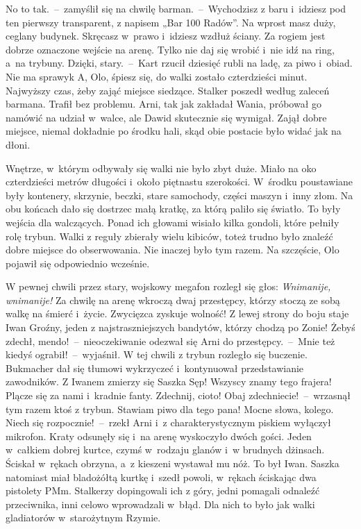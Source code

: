 \documentclass[../MAIN.tex]{subfiles}
\begin{document}
\xx No to tak.~--~zamyślił się na chwilę barman.~--~Wychodzisz z baru i~idziesz pod ten pierwszy transparent, z napisem „Bar 100 Radów”. Na wprost masz duży, ceglany budynek. Skręcasz w~prawo i~idziesz wzdłuż ściany. Za rogiem jest dobrze oznaczone wejście na arenę. Tylko nie daj się wrobić i~nie idź na ring, a~na trybuny.
\xx Dzięki, stary.~--~Kart rzucił dziesięć rubli na ladę, za piwo i~obiad.
\xx Nie ma sprawy\3k A, Olo, śpiesz się, do walki zostało czterdzieści minut. Najwyższy czas, żeby zająć miejsce siedzące.
\qd
Stalker poszedł według zaleceń barmana. Trafił bez problemu. Arni, tak jak zakładał Wania, próbował go namówić na udział w~walce, ale Dawid skutecznie się wymigał. Zajął dobre miejsce, niemal dokładnie po środku hali, skąd obie postacie było widać jak na dłoni.

Wnętrze, w~którym odbywały się walki nie było zbyt duże. Miało na oko czterdzieści metrów długości i~około piętnastu szerokości. W~środku poustawiane były kontenery, skrzynie, beczki, stare samochody, części maszyn i~inny złom. Na obu końcach dało się dostrzec małą kratkę, za którą paliło się światło. To były wejścia dla walczących. Ponad ich głowami wisiało kilka gondoli, które pełniły rolę trybun. Walki z reguły zbierały wielu kibiców, toteż trudno było znaleźć dobre miejsce do obserwowania. Nie inaczej było tym razem. Na szczęście, Olo pojawił się odpowiednio wcześnie.

W pewnej chwili przez stary, wojskowy megafon rozległ się głos:
\sx \textit{Wnimanije, wnimanije!} Za chwilę na arenę wkroczą dwaj przestępcy, którzy stoczą ze sobą walkę na śmierć i~życie. Zwycięzca zyskuje wolność! Z lewej strony do boju staje Iwan Groźny, jeden z najstraszniejszych bandytów, którzy chodzą po Zonie! Żebyś zdechł, mendo!~--~nieoczekiwanie odezwał się Arni do przestępcy.~--~Mnie też kiedyś ograbił!~--~wyjaśnił.
\qm
W tej chwili z trybun rozległo się buczenie. Bukmacher dał się tłumowi wykrzyczeć i~kontynuował przedstawianie zawodników.
\sx Z Iwanem zmierzy się Saszka Sęp! Wszyscy znamy tego frajera! Plącze się za nami i~kradnie fanty.
\xx Zdechnij, cioto! Obaj zdechniecie!~--~wrzasnął tym razem ktoś z trybun.
\xx Stawiam piwo dla tego pana! Mocne słowa, kolego. Niech się rozpocznie!~--~rzekł Arni i~z charakterystycznym piskiem wyłączył mikrofon.
\qm
Kraty odsunęły się i~na arenę wyskoczyło dwóch gości. Jeden w~całkiem dobrej kurtce, czymś w~rodzaju glanów i~w brudnych dżinsach. Ściskał w~rękach obrzyna, a~z kieszeni wystawał mu nóż. To był Iwan. Saszka natomiast miał bladożółtą kurtkę i~szedł powoli, w~rękach ściskając dwa pistolety PMm. Stalkerzy dopingowali ich z góry, jedni pomagali odnaleźć przeciwnika, inni celowo wprowadzali w~błąd. Dla nich to było jak walki gladiatorów w~starożytnym Rzymie.
\end{document}
